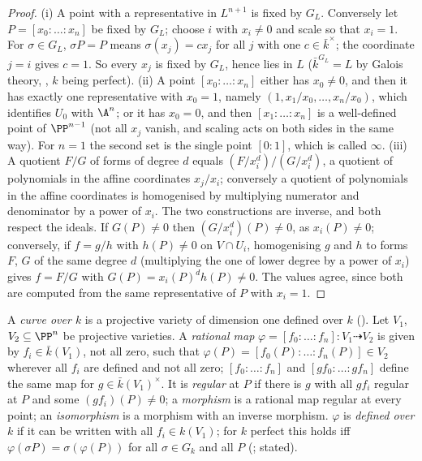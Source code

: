 \begin{proof}
(i) A point with a representative in $L^{n+1}$ is fixed by $G_L$. Conversely let $P=[x_0:\dots:x_n]$ be fixed by $G_L$; choose $i$ with $x_i\ne0$ and
scale so that $x_i=1$. For $\sigma\in G_L$, $\sigma P=P$ means $\sigma(x_j)=cx_j$ for all $j$ with one $c\in\bar k^\times$; the coordinate $j=i$ gives $c=1$. So
every $x_j$ is fixed by $G_L$, hence lies in $L$ ($\bar k^{G_L}=L$ by Galois theory, , $k$ being perfect). (ii) A point $[x_0:\dots:x_n]$
either has $x_0\ne0$, and then it has exactly one representative with $x_0=1$, namely $(1,x_1/x_0,\dots,x_n/x_0)$, which identifies $U_0$ with $\A^n$; or it has
$x_0=0$, and then $[x_1:\dots:x_n]$ is a well-defined point of $\PP^{n-1}$ (not all $x_j$ vanish, and scaling acts on both sides in the same way). For $n=1$
the second set is the single point $[0:1]$, which is called $\infty$. (iii) A quotient
$F/G$ of forms of degree $d$ equals $(F/x_i^d)/(G/x_i^d)$, a quotient of polynomials in the affine coordinates $x_j/x_i$; conversely a quotient of
polynomials in the affine coordinates is homogenised by multiplying numerator and denominator by a power of $x_i$. The two constructions are
inverse, and both respect the ideals. If $G(P)\ne0$ then $(G/x_i^d)(P)\ne0$, as $x_i(P)\ne0$; conversely, if $f=g/h$ with $h(P)\ne0$ on $V\cap U_i$,
homogenising $g$ and $h$ to forms $F$, $G$ of the same degree $d$ (multiplying the one of lower degree by a power of $x_i$) gives $f=F/G$ with
$G(P)=x_i(P)^dh(P)\ne0$. The values agree, since both are computed from the same representative of $P$ with $x_i=1$.
\end{proof}

\begin{definition}\label{def:curves:curve-morphism}
A \emph{curve over $k$} is a projective variety of dimension one defined over $k$ (). Let $V_1$, $V_2\subseteq\PP^n$
be projective varieties. A \emph{rational map} $\varphi=[f_0:\dots:f_n]\colon V_1\dashrightarrow V_2$ is given by $f_i\in\bar k(V_1)$, not all zero, such that
$\varphi(P)=[f_0(P):\dots:f_n(P)]\in V_2$ wherever all $f_i$ are defined and not all zero; $[f_0:\dots:f_n]$ and $[gf_0:\dots:gf_n]$ define the same map
for $g\in\bar k(V_1)^\times$. It is \emph{regular} at $P$ if there is $g$ with all $gf_i$ regular at $P$ and some $(gf_i)(P)\ne0$; a \emph{morphism} is a
rational map regular at every point; an \emph{isomorphism} is a morphism with an inverse morphism. $\varphi$ is \emph{defined over $k$} if it can be
written with all $f_i\in k(V_1)$; for $k$ perfect this holds iff $\varphi(\sigma P)=\sigma(\varphi(P))$ for all $\sigma\in G_k$ and all $P$
(\cite[Chapter I, Section 3]{SilvermanAEC}; stated).
\end{definition}


